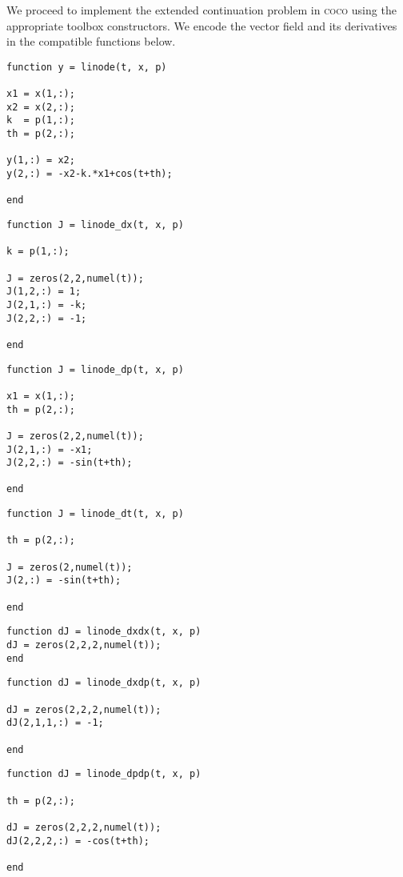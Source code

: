 We proceed to implement the extended continuation problem in \textsc{coco} using the appropriate  toolbox constructors. We encode the vector field and its derivatives in the  compatible functions below. 
\begin{lstlisting}[language=coco-highlight]
function y = linode(t, x, p)

x1 = x(1,:);
x2 = x(2,:);
k  = p(1,:);
th = p(2,:);

y(1,:) = x2;
y(2,:) = -x2-k.*x1+cos(t+th);

end
\end{lstlisting}
\begin{lstlisting}[language=coco-highlight]
function J = linode_dx(t, x, p)

k = p(1,:);

J = zeros(2,2,numel(t));
J(1,2,:) = 1;
J(2,1,:) = -k;
J(2,2,:) = -1;

end
\end{lstlisting}
\begin{lstlisting}[language=coco-highlight]
function J = linode_dp(t, x, p)

x1 = x(1,:);
th = p(2,:);

J = zeros(2,2,numel(t));
J(2,1,:) = -x1;
J(2,2,:) = -sin(t+th);

end
\end{lstlisting}
\begin{lstlisting}[language=coco-highlight]
function J = linode_dt(t, x, p)

th = p(2,:);

J = zeros(2,numel(t));
J(2,:) = -sin(t+th);

end
\end{lstlisting}
\begin{lstlisting}[language=coco-highlight]
function dJ = linode_dxdx(t, x, p)
dJ = zeros(2,2,2,numel(t));
end
\end{lstlisting}
\begin{lstlisting}[language=coco-highlight]
function dJ = linode_dxdp(t, x, p)

dJ = zeros(2,2,2,numel(t));
dJ(2,1,1,:) = -1;

end
\end{lstlisting}
\begin{lstlisting}[language=coco-highlight]
function dJ = linode_dpdp(t, x, p)

th = p(2,:);

dJ = zeros(2,2,2,numel(t));
dJ(2,2,2,:) = -cos(t+th);

end
\end{lstlisting}
